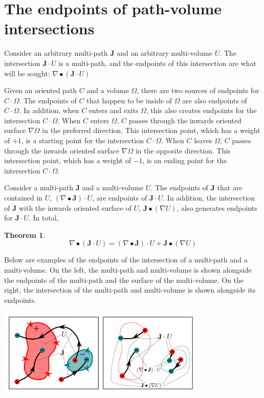 \documentclass{book}
\newtheorem{thm}{Theorem}
\begin{document}
\section{The endpoints of path-volume intersections}\label{sec:endpoints_of_path_volume_intersect}

Consider an arbitrary multi-path \(\mathbf{J}\) and an arbitrary multi-volume \(U\). The intersection \(\mathbf{J} \cdot U\) is a multi-path, and the endpoints of this intersection are what will be sought: \(\nabla \bullet (\mathbf{J} \cdot U)\) 

Given an oriented path \(C\) and a volume \(\Omega\), there are two sources of endpoints for \(C \cdot \Omega\). The endpoints of \(C\) that happen to be inside of \(\Omega\) are also endpoints of \(C \cdot \Omega\). In addition, when \(C\) enters and exits \(\Omega\), this also creates endpoints for the intersection \(C \cdot \Omega\). When \(C\) enters \(\Omega\), \(C\) passes through the inwards oriented surface \(\nabla \Omega\) in the preferred direction. This intersection point, which has a weight of \(+1\), is a starting point for the intersection \(C \cdot \Omega\). When \(C\) leaves \(\Omega\), \(C\) passes through the inwards oriented surface \(\nabla \Omega\) in the opposite direction. This intersection point, which has a weight of \(-1\), is an ending point for the intersection \(C \cdot \Omega\).   

Consider a multi-path \(\mathbf{J}\) and a multi-volume \(U\). The endpoints of \(\mathbf{J}\) that are contained in \(U\), \((\nabla \bullet \mathbf{J}) \cdot U\), are endpoints of \(\mathbf{J} \cdot U\). In addition, the intersection of \(\mathbf{J}\) with the inwards oriented surface of \(U\), \(\mathbf{J} \bullet (\nabla U)\), also generates endpoints for \(\mathbf{J} \cdot U\). In total,  

\begin{thm}
\[\nabla \bullet (\mathbf{J} \cdot U) = (\nabla \bullet \mathbf{J}) \cdot U + \mathbf{J} \bullet (\nabla U)\]
\end{thm}

Below are examples of the endpoints of the intersection of a multi-path and a multi-volume. On the left, the multi-path and multi-volume is shown alongside the endpoints of the multi-path and the surface of the multi-volume. On the right, the intersection of the multi-path and multi-volume is shown alongside its endpoints.

\begin{center}
\includegraphics[width = 0.75\textwidth]{Boundaries/Path_endpoints/path_volume_intersection_endpoints}
\end{center}
\end{document}
